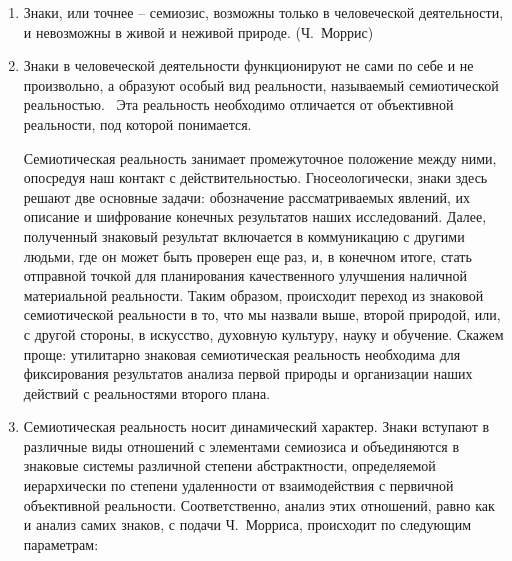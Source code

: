 \begin{enumerate}
\item Знаки, или точнее -- семиозис, возможны только в человеческой деятельности, и невозможны в
  живой и неживой природе. (Ч.~Моррис)
\item Знаки в человеческой деятельности функционируют не сами по себе и не произвольно,
  а образуют особый вид реальности, называемый семиотической реальностью.~\autocite{gorny}
  Эта реальность необходимо отличается от объективной реальности, под которой понимается.
  Семиотическая реальность занимает промежуточное положение между ними,
  опосредуя наш контакт с действительностью. Гносеологически, знаки здесь решают две
  основные задачи: обозначение рассматриваемых явлений, их описание и шифрование конечных результатов
  наших исследований. Далее, полученный знаковый результат включается в коммуникацию
  с другими людьми, где он может быть проверен еще раз, и, в конечном итоге, стать отправной
  точкой для планирования качественного улучшения наличной материальной реальности.
  Таким образом, происходит переход из знаковой семиотической реальности в то, что мы назвали выше,
  второй природой, или, с другой стороны, в искусство, духовную культуру, науку и обучение.
  Скажем проще: утилитарно знаковая семиотическая реальность необходима для фиксирования результатов
  анализа первой природы и организации наших действий с реальностями второго плана.
\item Семиотическая реальность носит динамический характер. Знаки вступают в различные
  виды отношений с элементами семиозиса и объединяются в знаковые системы различной
  степени абстрактности, определяемой иерархически по степени удаленности от взаимодействия
  с первичной объективной реальности. Соответственно, анализ этих отношений, равно как и анализ
  самих знаков, с подачи Ч.~Морриса, происходит по следующим параметрам:
\end{enumerate}
